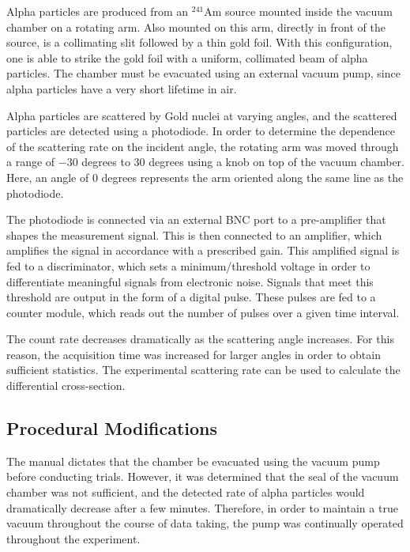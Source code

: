 \documentclass[a4paper]{article}
\begin{document}

\qq Alpha particles are produced from an $^{241}$Am source mounted inside the vacuum chamber on a rotating arm. Also mounted on this arm, directly in front of the source, is a collimating slit followed by a thin gold foil. With this configuration, one is able to strike the gold foil with a uniform, collimated beam of alpha particles. The chamber must be evacuated using an external vacuum pump, since alpha particles have a very short lifetime in air.

\qq Alpha particles are scattered by Gold nuclei at varying angles, and the scattered particles are detected using a photodiode. In order to determine the dependence of the scattering rate on the incident angle, the rotating arm was moved through a range of $-30$ degrees to $30$ degrees using a knob on top of the vacuum chamber. Here, an angle of 0 degrees represents the arm oriented along the same line as the photodiode.

\qq The photodiode is connected via an external BNC port to a pre-amplifier that shapes the measurement signal. This is then connected to an amplifier, which amplifies the signal in accordance with a prescribed gain. This amplified signal is fed to a discriminator, which sets a minimum/threshold voltage in order to differentiate meaningful signals from electronic noise. Signals that meet this threshold are output in the form of a digital pulse. These pulses are fed to a counter module, which reads out the number of pulses over a given time interval.

The count rate decreases dramatically as the scattering angle increases. For this reason, the acquisition time was increased for larger angles in order to obtain sufficient statistics. The experimental scattering rate can be used to calculate the differential cross-section.

\subsection{Procedural Modifications}
\qq The manual dictates that the chamber be evacuated using the vacuum pump before conducting trials. However, it was determined that the seal of the vacuum chamber was not sufficient, and the detected rate of alpha particles would dramatically decrease after a few minutes. Therefore, in order to maintain a true vacuum throughout the course of data taking, the pump was continually operated throughout the experiment.
\qq 
\end{document}
